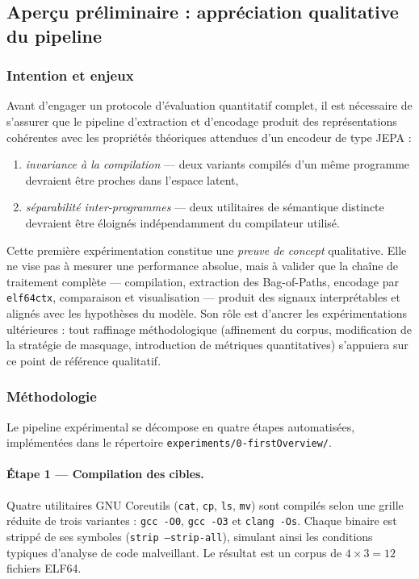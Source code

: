 \subsection{Aperçu préliminaire : appréciation qualitative du pipeline}
\label{sub:exp0}

\subsubsection{Intention et enjeux}

Avant d'engager un protocole d'évaluation quantitatif complet, il est
nécessaire de s'assurer que le pipeline d'extraction et d'encodage produit des
représentations cohérentes avec les propriétés théoriques attendues d'un
encodeur de type JEPA : 
\begin{enumerate}
  \item \emph{invariance à la compilation} — deux variants
compilés d'un même programme devraient être proches dans l'espace latent,
  \item \emph{séparabilité inter-programmes} — deux utilitaires de sémantique
distincte devraient être éloignés indépendamment du compilateur utilisé.
\end{enumerate}
Cette première expérimentation constitue une \emph{preuve de concept}
qualitative. 
Elle ne vise pas à mesurer une performance absolue, mais à valider
que la chaîne de traitement complète — compilation, extraction des
Bag-of-Paths, encodage par \texttt{elf64ctx}, comparaison et visualisation —
produit des signaux interprétables et alignés avec les hypothèses du modèle.
Son rôle est d'ancrer les expérimentations ultérieures : tout raffinage
méthodologique (affinement du corpus, modification de la stratégie de masquage,
introduction de métriques quantitatives) s'appuiera sur ce point de référence
qualitatif.

\subsubsection{Méthodologie}

Le pipeline expérimental se décompose en quatre étapes automatisées,
implémentées dans le répertoire \texttt{experiments/0-firstOverview/}.

\paragraph{Étape 1 — Compilation des cibles.}
Quatre utilitaires GNU Coreutils (\texttt{cat}, \texttt{cp}, \texttt{ls},
\texttt{mv}) sont compilés selon une grille réduite de trois variantes :
\texttt{gcc~-O0}, \texttt{gcc~-O3} et \texttt{clang~-Os}. Chaque binaire est
strippé de ses symboles (\texttt{strip~--strip-all}), simulant ainsi les
conditions typiques d'analyse de code malveillant. Le résultat est un corpus
de $4 \times 3 = 12$ fichiers ELF64.

